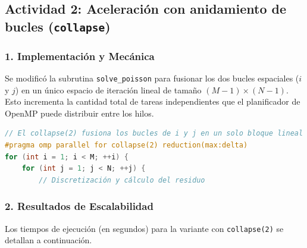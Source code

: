 \documentclass[11pt,a4paper]{article}
\begin{document}
\subsection*{Actividad 2: Aceleración con anidamiento de bucles (\texttt{collapse})}

\subsubsection*{1. Implementación y Mecánica}
Se modificó la subrutina \texttt{solve\_poisson} para fusionar los dos bucles espaciales ($i$ y $j$) en un único espacio de iteración lineal de tamaño $(M-1) \times (N-1)$. Esto incrementa la cantidad total de tareas independientes que el planificador de OpenMP puede distribuir entre los hilos.

\begin{lstlisting}[language=C++, caption={Implementación de collapse en \texttt{poisson\_collapse.cpp}}, label={lst:act2}]
// El collapse(2) fusiona los bucles de i y j en un solo bloque lineal
#pragma omp parallel for collapse(2) reduction(max:delta)
for (int i = 1; i < M; ++i) {
    for (int j = 1; j < N; ++j) {
        // Discretización y cálculo del residuo
\end{lstlisting}

\subsubsection*{2. Resultados de Escalabilidad}
Los tiempos de ejecución (en segundos) para la variante con \texttt{collapse(2)} se detallan a continuación.
\end{document}
